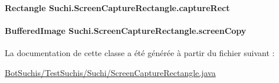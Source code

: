 \paragraph[{capture\+Rect}]{\setlength{\rightskip}{0pt plus 5cm}Rectangle Suchi.\+Screen\+Capture\+Rectangle.\+capture\+Rect\hspace{0.3cm}{\ttfamily [package]}}\label{classSuchi_1_1ScreenCaptureRectangle_a9e4def2c62ac05870927e8e569793bac}
\hypertarget{classSuchi_1_1ScreenCaptureRectangle_a10418bec3a42a9640b3230f89c45d2e5}{}
\paragraph[{screen\+Copy}]{\setlength{\rightskip}{0pt plus 5cm}Buffered\+Image Suchi.\+Screen\+Capture\+Rectangle.\+screen\+Copy}\label{classSuchi_1_1ScreenCaptureRectangle_a10418bec3a42a9640b3230f89c45d2e5}


La documentation de cette classe a été générée à partir du fichier suivant \+:\begin{DoxyCompactItemize}
\item 
\hyperlink{BotSuchis_2TestSuchis_2Suchi_2ScreenCaptureRectangle_8java}{Bot\+Suchis/\+Test\+Suchis/\+Suchi/\+Screen\+Capture\+Rectangle.\+java}\end{DoxyCompactItemize}
